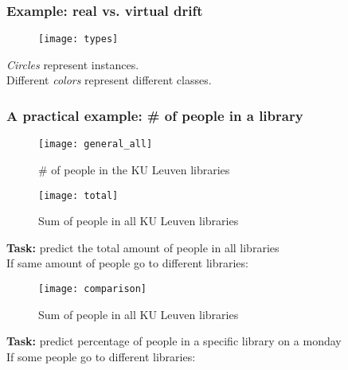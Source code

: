 \begin{frame}
\frametitle{Example: real vs. virtual drift}
\begin{figure}
	\texttt{[image: types]}
\end{figure}
\textit{Circles} represent instances.\\
Different \textit{colors} represent different classes.

\end{frame}

\begin{frame}[allowframebreaks]
\frametitle{A practical example: \# of people in a library}
\begin{figure}
	\texttt{[image: general\_all]}
	\caption	{\# of people in the KU Leuven libraries}
\end{figure}

\end{frame}

\begin{frame}

\begin{figure}
	\texttt{[image: total]}
	\caption	{Sum of people in all KU Leuven libraries}
\end{figure}
\textbf{Task:} predict the total amount of people in all libraries\\
If same amount of people go to different libraries: 
\end{frame}
\begin{frame}

\begin{figure}
	\texttt{[image: comparison]}
	\caption	{Sum of people in all KU Leuven libraries}
\end{figure}
\textbf{Task:} predict percentage of people in a specific library on a monday\\
If some people go to different libraries: 
\end{frame}